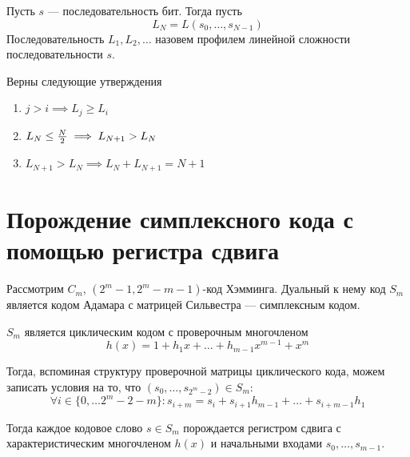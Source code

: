 \begin{definition}
Пусть $s$ --- последовательность бит. Тогда пусть $$L_N = L(s_0, \ldots, s_{N-1})$$
Последовательность $L_1, L_2, \ldots$ назовем профилем линейной сложности
последовательности $s$.
\end{definition}


\begin{proposition}
Верны следующие утверждения
\begin{enumerate}
\item $j > i \implies L_j \ge L_i$
\item $L_N \le {N \over 2} \implies L_{N+1} > L_N$
\item $L_{N+1} > L_N \implies L_{N} + L_{N+1} = N+1$
\end{enumerate}
\end{proposition}

\section{Порождение симплексного кода с помощью регистра сдвига}

\begin{definition}
Рассмотрим $C_m$, $(2^m - 1, 2^m - m - 1)$-код Хэмминга. Дуальный к нему код
$S_m$ является кодом Адамара с матрицей Сильвестра --- симплексным кодом.
\end{definition}

\begin{remark}
$S_m$ является циклическим кодом с проверочным многочленом 
$$h(x) = 1 + h_1 x + \ldots + h_{m-1} x^{m-1} + x^m$$

Тогда, вспоминая структуру проверочной матрицы циклического кода,
можем записать условия на то, что $(s_0, \ldots, s_{2^m - 2}) \in S_m$:
$$\forall i \in \{0, \ldots 2^m-2-m\} \colon
  s_{i+m} = s_i + s_{i+1} h_{m-1} + \ldots + s_{i+m-1} h_1$$
\end{remark}

Тогда каждое кодовое слово $s \in S_m$ порождается регистром сдвига с характеристическим
многочленом $h(x)$ и начальными входами $s_0, \ldots, s_{m-1}$.
